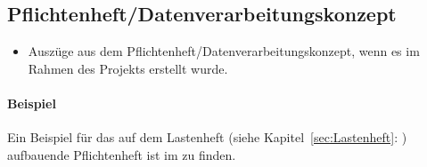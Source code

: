 \subsection{Pflichtenheft/Datenverarbeitungskonzept}
\label{sec:Pflichtenheft}
\begin{itemize}
	\item Auszüge aus dem Pflichtenheft/Datenverarbeitungskonzept, wenn es im Rahmen des Projekts erstellt wurde.
\end{itemize}

\paragraph{Beispiel}
Ein Beispiel für das auf dem Lastenheft (siehe Kapitel~\ref{sec:Lastenheft}: ) aufbauende Pflichtenheft ist im  zu finden.
